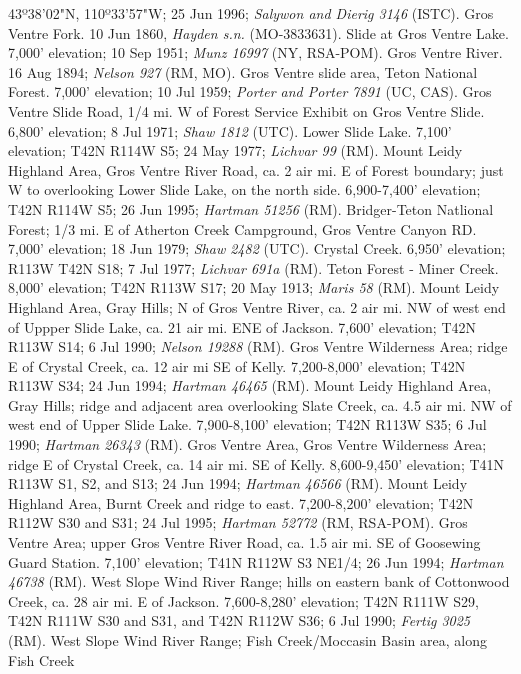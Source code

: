 43º38'02"N, 110º33'57"W; 25 Jun 1996; \textit{Salywon and Dierig 3146} (ISTC).
Gros Ventre Fork. 10 Jun 1860, \textit{Hayden s.n.} (MO-3833631).
Slide at Gros Ventre Lake. 7,000' elevation; 10 Sep 1951;
\textit{Munz 16997} (NY, RSA-POM).
Gros Ventre River. 16 Aug 1894; \textit{Nelson 927} (RM, MO).
Gros Ventre slide area, Teton National Forest. 7,000' elevation; 10 Jul 1959;
\textit{Porter and Porter 7891} (UC, CAS).
Gros Ventre Slide Road, 1/4 mi. W of Forest Service Exhibit on Gros Ventre
Slide. 6,800' elevation; 8 Jul 1971; \textit{Shaw 1812} (UTC).
Lower Slide Lake. 7,100' elevation; T42N R114W S5; 24 May 1977;
\textit{Lichvar 99} (RM).
Mount Leidy Highland Area, Gros Ventre River Road, ca. 2 air mi. E of Forest
boundary; just W to overlooking Lower Slide Lake, on the north side.
6,900-7,400' elevation; T42N R114W S5; 26 Jun 1995;
\textit{Hartman 51256} (RM).
Bridger-Teton Natlional Forest; 1/3 mi. E of Atherton Creek Campground, Gros
Ventre Canyon RD. 7,000' elevation; 18 Jun 1979; \textit{Shaw 2482} (UTC).
Crystal Creek. 6,950' elevation; R113W T42N S18; 7 Jul 1977;
\textit{Lichvar 691a} (RM).
Teton Forest - Miner Creek. 8,000' elevation; T42N R113W S17; 20 May 1913;
\textit{Maris 58} (RM).
Mount Leidy Highland Area, Gray Hills; N of Gros Ventre River, ca. 2 air mi.
NW of west end of Uppper Slide Lake, ca. 21 air mi. ENE of Jackson.
7,600' elevation; T42N R113W S14; 6 Jul 1990; \textit{Nelson 19288} (RM).
Gros Ventre Wilderness Area; ridge E of Crystal Creek, ca. 12 air mi
SE of Kelly. 7,200-8,000' elevation; T42N R113W S34; 24 Jun 1994;
\textit{Hartman 46465} (RM).
Mount Leidy Highland Area, Gray Hills; ridge and adjacent area overlooking
Slate Creek, ca. 4.5 air mi. NW of west end of Upper Slide Lake. 7,900-8,100'
elevation; T42N R113W S35; 6 Jul 1990; \textit{Hartman 26343} (RM).
Gros Ventre Area, Gros Ventre Wilderness Area; ridge E of Crystal Creek,
ca. 14 air mi. SE of Kelly. 8,600-9,450' elevation;
T41N R113W S1, S2, and S13; 24 Jun 1994; \textit{Hartman 46566} (RM).
Mount Leidy Highland Area, Burnt Creek and ridge to east.
7,200-8,200' elevation; T42N R112W S30 and S31; 24 Jul 1995;
\textit{Hartman 52772} (RM, RSA-POM).
Gros Ventre Area; upper Gros Ventre River Road, ca. 1.5 air mi. SE of
Goosewing Guard Station. 7,100' elevation; T41N R112W S3 NE1/4; 26 Jun 1994;
\textit{Hartman 46738} (RM).
West Slope Wind River Range; hills on eastern bank of Cottonwood Creek, ca.
28 air mi. E of Jackson. 7,600-8,280' elevation; T42N R111W S29, T42N R111W
S30 and S31, and T42N R112W S36; 6 Jul 1990; \textit{Fertig 3025} (RM).
West Slope Wind River Range; Fish Creek/Moccasin Basin area, along Fish Creek
